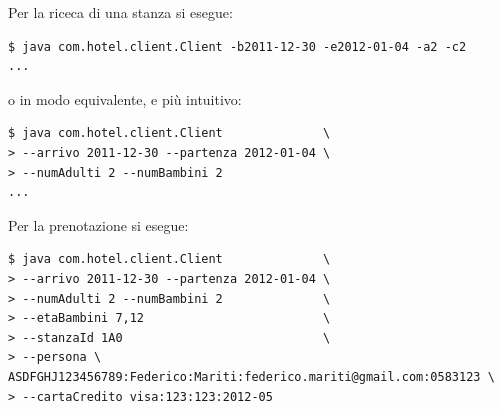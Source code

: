 \documentclass[a4paper]{article}
\begin{document}
Per la riceca di una stanza si esegue:
\begin{verbatim}
$ java com.hotel.client.Client -b2011-12-30 -e2012-01-04 -a2 -c2
...
\end{verbatim}
o in modo equivalente, e pi\`u intuitivo:
\begin{verbatim}
$ java com.hotel.client.Client              \
> --arrivo 2011-12-30 --partenza 2012-01-04 \
> --numAdulti 2 --numBambini 2 
...
\end{verbatim}
Per la prenotazione si esegue:
\begin{verbatim}
$ java com.hotel.client.Client              \
> --arrivo 2011-12-30 --partenza 2012-01-04 \
> --numAdulti 2 --numBambini 2              \
> --etaBambini 7,12                         \
> --stanzaId 1A0                            \
> --persona \
ASDFGHJ123456789:Federico:Mariti:federico.mariti@gmail.com:0583123 \
> --cartaCredito visa:123:123:2012-05
\end{verbatim}
\end{document}
